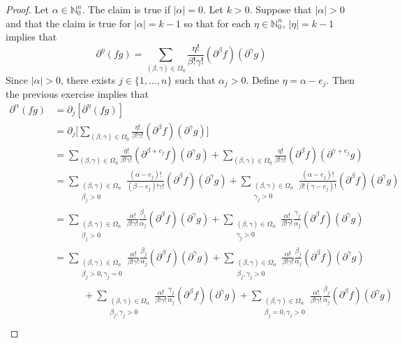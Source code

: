 \documentclass[12pt]{amsart}
\theoremstyle{definition}
\newcommand{\p}{\partial}
\newcommand{\al}{\alpha}
\newcommand{\be}{\beta}
\newcommand{\gam}{\gamma}
\newcommand{\Om}{\Omega}
\newcommand{\N}{\mathbb{N}}
\begin{document}
	\begin{proof}
		Let $\al \in \N^n_0$. The claim is true if $|\al| = 0$. Let $k > 0$. Suppose that $|\al| > 0$ and that the claim is true for $|\al| = k - 1$ so that for each $\eta \in \N^n_0$, $|\eta| = k-1$ implies that 
		$$\p^{\eta}(fg) = \sum_{(\be, \gam) \in \Om_{\eta}} \frac{\eta!}{\be !\gam!}( \p^{\be} f) (\p^{\gam}g)$$ 
		Since $|\al| > 0$, there exists $j \in \{1, \ldots, n\}$ such that $\al_j > 0$. Define $\eta = \al - e_j$. Then the previous exercise implies that 
		\begin{align*}
			\p^{\al}(fg)
			&= \p_j [\p^{\eta}(fg)] \\
			&= \p_j \bigg[ \sum_{(\be, \gam) \in \Om_{\eta}} \frac{\eta!}{\be !\gam!}( \p^{\be} f) (\p^{\gam}g) \bigg] \\
			&= \sum_{(\be, \gam) \in \Om_{\eta}} \frac{\eta!}{\be !\gam!}(\p^{\be + e_j} f) (\p^{\gam}g) + \sum_{(\be, \gam) \in \Om_{\eta}} \frac{\eta!}{\be !\gam!} (\p^{\be} f) (\p^{\gam + e_j}g) \\
			&= \sum_{\substack{(\be, \gam) \in \Om_{\al} \\ \be_j > 0}} \frac{(\al - e_j)!}{(\be - e_j) !\gam!}(\p^{\be} f) (\p^{\gam}g) + \sum_{\substack{(\be, \gam) \in \Om_{\al} \\ \gam_j > 0}} \frac{(\al - e_j)!}{\be ! (\gam - e_j)!} (\p^{\be} f) (\p^{\gam}g) \\
			& = \sum_{\substack{(\be, \gam) \in \Om_{\al} \\ \be_j > 0}} \frac{\al!}{\be !\gam !} \frac{\be_j}{\al_j}(\p^{\be} f) (\p^{\gam}g) + \sum_{\substack{(\be, \gam) \in \Om_{\al} \\ \gam_j > 0}} \frac{\al!}{\be ! \gam !}\frac{\gam_j}{\al_j} (\p^{\be} f) (\p^{\gam}g) \\
			& = \sum_{\substack{(\be, \gam) \in \Om_{\al} \\ \be_j > 0, \gam_j = 0}} \frac{\al!}{\be !\gam !} \frac{\be_j}{\al_j}(\p^{\be} f) (\p^{\gam}g) 
			+ \sum_{\substack{(\be, \gam) \in \Om_{\al} \\ \be_j, \gam_j > 0}} \frac{\al!}{\be !\gam !} \frac{\be_j}{\al_j}(\p^{\be} f) (\p^{\gam}g) \\
			& \quad \quad \quad + \sum_{\substack{(\be, \gam) \in \Om_{\al} \\ \be_j, \gam_j > 0}} \frac{\al!}{\be ! \gam !}\frac{\gam_j}{\al_j} (\p^{\be} f) (\p^{\gam}g) 
			+ \sum_{\substack{(\be, \gam) \in \Om_{\al} \\ \be_j = 0, \gam_j > 0}} \frac{\al!}{\be !\gam !} \frac{\be_j}{\al_j}(\p^{\be} f) (\p^{\gam}g)\\ 

\end{align*}
\end{proof}
\end{document}
